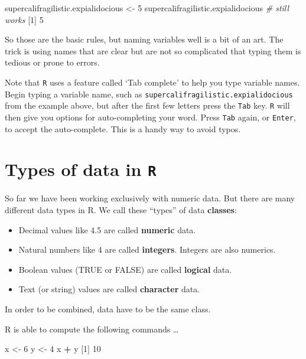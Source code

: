 \documentclass[
]{book}
\newenvironment{Shaded}{\begin{snugshade}}{\end{snugshade}}
\newcommand{\CommentTok}[1]{\textcolor[rgb]{0.56,0.35,0.01}{\textit{#1}}}
\newcommand{\DecValTok}[1]{\textcolor[rgb]{0.00,0.00,0.81}{#1}}
\newcommand{\NormalTok}[1]{#1}
\newcommand{\OperatorTok}[1]{\textcolor[rgb]{0.81,0.36,0.00}{\textbf{#1}}}
\newcommand{\StringTok}[1]{\textcolor[rgb]{0.31,0.60,0.02}{#1}}
\providecommand{\tightlist}{%
  \setlength{\itemsep}{0pt}\setlength{\parskip}{0pt}}
\begin{document}
\begin{Shaded}
\begin{Highlighting}[]
\NormalTok{supercalifragilistic.expialidocious <-}\StringTok{ }\DecValTok{5}
\NormalTok{supercalifragilistic.expialidocious  }\CommentTok{# still works}
\NormalTok{[}\DecValTok{1}\NormalTok{] }\DecValTok{5}
\end{Highlighting}
\end{Shaded}

So those are the basic rules, but naming variables well is a bit of an art. The trick is using names that are clear but are not so complicated that typing them is tedious or prone to errors.

Note that \texttt{R} uses a feature called `Tab complete' to help you type variable names. Begin typing a variable name, such as \texttt{supercalifragilistic.expialidocious} from the example above, but after the first few letters press the \texttt{Tab} key. \texttt{R} will then give you options for auto-completing your word. Press \texttt{Tab} again, or \texttt{Enter}, to accept the auto-complete. This is a handy way to avoid typos.

\hypertarget{types-of-data-in-r}{%
\section*{\texorpdfstring{Types of data in \texttt{R}}{Types of data in R}}\label{types-of-data-in-r}}

So far we have been working exclusively with numeric data. But there are many different data types in R. We call these ``types'' of data \textbf{classes}:

\begin{itemize}
\tightlist
\item
  Decimal values like 4.5 are called \textbf{numeric} data.
\item
  Natural numbers like 4 are called \textbf{integers}. Integers are also numerics.
\item
  Boolean values (TRUE or FALSE) are called \textbf{logical} data.
\item
  Text (or string) values are called \textbf{character} data.
\end{itemize}

In order to be combined, data have to be the same class.

R is able to compute the following commands \ldots{}

\begin{Shaded}
\begin{Highlighting}[]
\NormalTok{x <-}\StringTok{ }\DecValTok{6}
\NormalTok{y <-}\StringTok{ }\DecValTok{4}
\NormalTok{x }\OperatorTok{+}\StringTok{ }\NormalTok{y}
\NormalTok{[}\DecValTok{1}\NormalTok{] }\DecValTok{10}
\end{Highlighting}
\end{Shaded}
\end{document}
